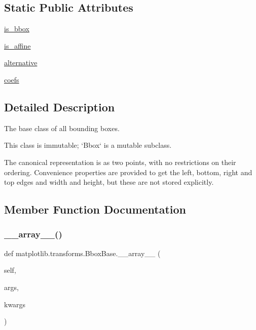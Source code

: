 \subsection*{Static Public Attributes}
\begin{DoxyCompactItemize}
\item 
\hyperlink{classmatplotlib_1_1transforms_1_1BboxBase_a65006b548c0d61fcf03c4dc7dec2ef91}{is\+\_\+bbox}
\item 
\hyperlink{classmatplotlib_1_1transforms_1_1BboxBase_a4bd13e9fcfce8ec38394c8259c4f76a8}{is\+\_\+affine}
\item 
\hyperlink{classmatplotlib_1_1transforms_1_1BboxBase_a46108795019176d0e54543a4b6306927}{alternative}
\item 
\hyperlink{classmatplotlib_1_1transforms_1_1BboxBase_a174f8d0cc67d4e0b7f27f862ecd7514b}{coefs}
\end{DoxyCompactItemize}


\subsection{Detailed Description}
\begin{DoxyVerb}The base class of all bounding boxes.

This class is immutable; `Bbox` is a mutable subclass.

The canonical representation is as two points, with no
restrictions on their ordering.  Convenience properties are
provided to get the left, bottom, right and top edges and width
and height, but these are not stored explicitly.
\end{DoxyVerb}
 

\subsection{Member Function Documentation}
\mbox{\label{classmatplotlib_1_1transforms_1_1BboxBase_a5c74dac673b5d4fe2f632b5d2bb49e74}} 
\subsubsection{\texorpdfstring{\+\_\+\+\_\+array\+\_\+\+\_\+()}{\_\_array\_\_()}}
{\footnotesize\ttfamily def matplotlib.\+transforms.\+Bbox\+Base.\+\_\+\+\_\+array\+\_\+\+\_\+ (\begin{DoxyParamCaption}\item[{}]{self,  }\item[{}]{args,  }\item[{}]{kwargs }\end{DoxyParamCaption})}

